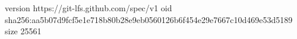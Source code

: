 version https://git-lfs.github.com/spec/v1
oid sha256:aa5b07d9fcf5e1e718b80b28e9eb0560126b6f454e29e7667c10d469e53d5189
size 25561
